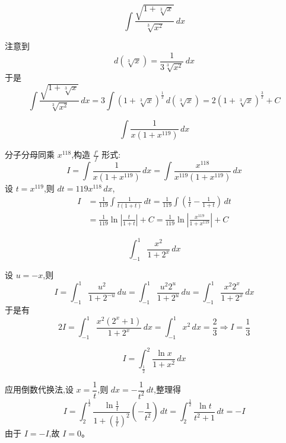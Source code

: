 \begin{questions}
    \question 
    \[
    \int \frac{\sqrt{1 + \sqrt[3]{x}}}{\sqrt[3]{x^2}} \, dx
    \]
    \begin{solution}
        注意到 
        \[
        d(\sqrt[3]{x}) = \frac{1}{3\sqrt[3]{x^2}} \, dx
        \]
        于是
        \[
        \int \frac{\sqrt{1 + \sqrt[3]{x}}}{\sqrt[3]{x^2}} \, dx = 3 \int (1+\sqrt[3]{x})^{\frac{1}{2}} \, d(\sqrt[3]{x}) = 2(1+\sqrt[3]{x})^{\frac{3}{2}} + C
        \]
    \end{solution}

    \question 
    \[
    \int \frac{1}{x(1+x^{119})} \, dx
    \]
    \begin{solution}
        分子分母同乘 $x^{118}$,构造 $\frac{f'}{f}$ 形式:
        \[
        I = \int \frac{1}{x(1+x^{119})} \, dx = \int \frac{x^{118}}{x^{119}(1+x^{119})} \, dx
        \]
        设 $t = x^{119}$,则 $dt = 119x^{118} \, dx$,
        \begin{align*}
        I &= \frac{1}{119} \int \frac{1}{t(1+t)} \, dt = \frac{1}{119} \int \left( \frac{1}{t} - \frac{1}{1+t} \right) \, dt \\
        &= \frac{1}{119} \ln\left| \frac{t}{1+t} \right| + C = \frac{1}{119} \ln\left| \frac{x^{119}}{1+x^{119}} \right| + C
        \end{align*}
    \end{solution}
    
    \question  
    \[
    \int_{-1}^1 \frac{x^2}{1+2^x} \,dx 
    \]
    \begin{solution}
        设 \( u = -x \),则
        \[
        I = \int_{-1}^1 \frac{u^2}{1+2^{-u}}\,du = \int_{-1}^1 \frac{u^2 2^u}{1+2^u}\,du = \int_{-1}^1 \frac{x^2 2^x}{1+2^x}\,dx
        \]
        于是有
        \[
        2I = \int_{-1}^1 \frac{x^2(2^x + 1)}{1 + 2^x}\,dx = \int_{-1}^1 x^2\,dx = \frac{2}{3} \Rightarrow I = \frac{1}{3}
        \]
    \end{solution}

    \question 
    \[
    I = \int_{\frac{1}{2}}^{2} \frac{\ln x}{1 + x^2} \, dx
    \]
    \begin{solution}
        应用倒数代换法,设 $x = \dfrac{1}{t}$,则 $dx = -\dfrac{1}{t^2} \, dt$,整理得
        \[
        I = \int_{2}^{\frac{1}{2}} \frac{\ln\frac{1}{t}}{1 + (\frac{1}{t})^2} \left( -\frac{1}{t^2} \right) \, dt = \int_{2}^{\frac{1}{2}} \frac{\ln t}{t^2+1} \, dt = -I
        \]
        由于 $I = -I$,故 $I = 0$。
    \end{solution}


\end{questions}

